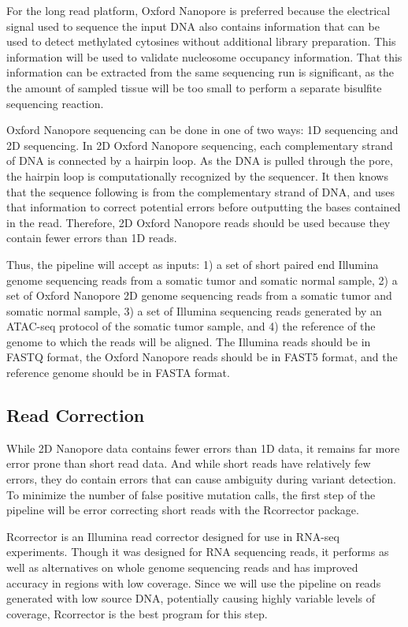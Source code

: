 For the long read platform, Oxford Nanopore is preferred because the electrical signal used to sequence the input DNA also contains information that can be used to detect methylated cytosines without additional library preparation. This information will be used to validate nucleosome occupancy information. That this information can be extracted from the same sequencing run is significant, as the the amount of sampled tissue will be too small to perform a separate bisulfite sequencing reaction.

Oxford Nanopore sequencing can be done in one of two ways: 1D sequencing and 2D sequencing.
In 2D Oxford Nanopore sequencing, each complementary strand of DNA is connected by a hairpin loop. As the DNA is pulled through the pore, the hairpin loop is computationally recognized by the sequencer. It then knows that the sequence following is from the complementary strand of DNA, and uses that information to correct potential errors before outputting the bases contained in the read.
Therefore, 2D Oxford Nanopore reads should be used because they contain fewer errors than 1D reads.

Thus, the pipeline will accept as inputs: 1) a set of short paired end Illumina genome sequencing reads from a somatic tumor and somatic normal sample, 2) a set of Oxford Nanopore 2D genome sequencing reads from a somatic tumor and somatic normal sample, 3) a set of Illumina sequencing reads generated by an ATAC-seq protocol of the somatic tumor sample, and 4) the reference of the genome to which the reads will be aligned. The Illumina reads should be in FASTQ format, the Oxford Nanopore reads should be in FAST5 format, and the reference genome should be in FASTA format.

\subsection{Read Correction}
While 2D Nanopore data contains fewer errors than 1D data, it remains far more error prone than short read data.
And while short reads have relatively few errors, they do contain errors that can cause ambiguity during variant detection.
To minimize the number of false positive mutation calls, the first step of the pipeline will be error correcting short reads with the Rcorrector package.

Rcorrector is an Illumina read corrector designed for use in RNA-seq experiments. Though it was designed for RNA sequencing reads, it performs as well as alternatives on whole genome sequencing reads and has improved accuracy in regions with low coverage. Since we will use the pipeline on reads generated with low source DNA, potentially causing highly variable levels of coverage, Rcorrector is the best program for this step.

